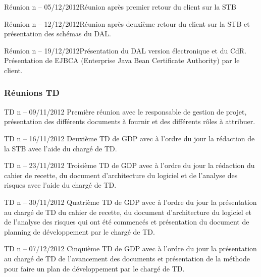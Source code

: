 \documentclass[a4paper,11pt,french]{article}
\begin{document}
\begin{paragraph}{Réunion n -- 05/12/2012}Réunion après premier retour du client sur la STB
\end{paragraph}

\begin{paragraph}{Réunion n -- 12/12/2012}Réunion après deuxième retour du client sur la STB et présentation des schémas du DAL.
\end{paragraph}

\begin{paragraph}{Réunion n -- 19/12/2012}Présentation du DAL version électronique et du CdR. Présentation de EJBCA (Enterprise Java Bean Certificate Authority) par le client.
\end{paragraph}

\subsubsection{Réunions TD}
\begin{paragraph}{TD n -- 09/11/2012}
Première réunion avec le responsable de gestion de projet, présentation des différents documents à fournir et des différents rôles à attribuer.
\end{paragraph}

\begin{paragraph}{TD n -- 16/11/2012}
Deuxième TD de GDP avec à l'ordre du jour la rédaction de la STB avec l'aide du chargé de TD.
\end{paragraph}

\begin{paragraph}{TD n -- 23/11/2012}
Troisième TD de GDP avec à l'ordre du jour la rédaction du cahier de recette, du document d'architecture du logiciel et de l'analyse des risques avec l'aide du chargé de TD.
\end{paragraph}

\begin{paragraph}{TD n -- 30/11/2012}
Quatrième TD de GDP avec à l'ordre du jour la présentation au chargé de TD du cahier de recette, du document d'architecture du logiciel et de l'analyse des risques qui ont été commencés et présentation du document de planning de développement par le chargé de TD.
\end{paragraph}

\begin{paragraph}{TD n -- 07/12/2012}
Cinquième TD de GDP avec à l'ordre du jour la présentation au chargé de TD de l'avancement des documents et présentation de la méthode pour faire un plan de développement par le chargé de TD.
\end{paragraph}
\end{document}
